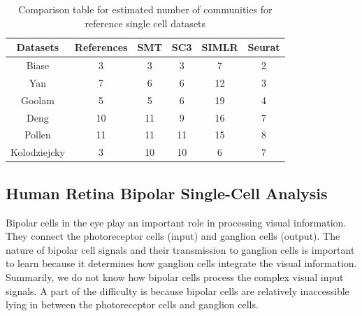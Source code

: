 \documentclass[11pt]{article}
\begin{document}
\begin{table}[h]
\centering
\caption{Comparison table for estimated number of communities for reference single cell datasets}\label{T9}
\begin{tabular}{|c | c | c | c | c | c|}
\hline
Datasets & References & SMT & SC3 & SIMLR & Seurat \\
\hline
Biase & 3 & 3  & 3 & 7 & 2 \\
Yan & 7 & 6 & 6 & 12 & 3 \\
Goolam & 5 & 5 & 6 & 19 & 4 \\
Deng & 10 & 11 & 9 & 16 & 7 \\
Pollen & 11 & 11 & 11  & 15 & 8 \\
Kolodziejcky & 3 & 10 & 10 & 6 & 7 \\
\hline
\end{tabular}
\end{table}

\subsection{Human Retina Bipolar Single-Cell Analysis} Bipolar cells in the eye play an important role in processing visual information. They connect the photoreceptor cells (input) and ganglion cells (output). The nature of bipolar cell signals and their transmission to ganglion cells is important to learn because it determines how ganglion cells integrate the visual information. Summarily, we do not know how bipolar cells process the complex visual input signals. A part of the difficulty is because bipolar cells are relatively inaccessible lying in between the photoreceptor cells and ganglion cells.
\end{document}
